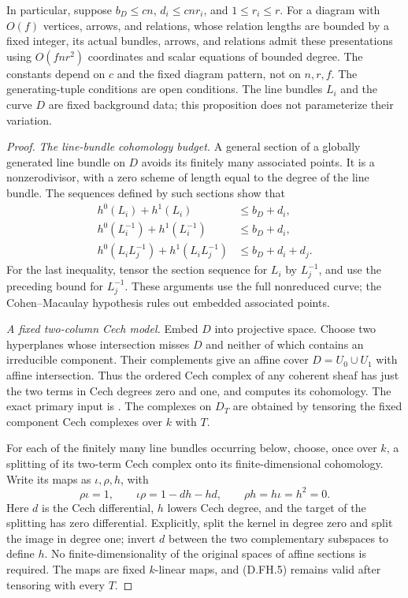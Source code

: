 \begin{proposition}
In particular, suppose $b_D\le cn$, $d_i\le cnr_i$, and
$1\le r_i\le r$. For a diagram with $O(f)$ vertices, arrows,
and relations, whose relation lengths are bounded by a fixed
integer, its actual bundles, arrows, and relations admit
these presentations using $O(fnr^2)$ coordinates and scalar
equations of bounded degree. The constants depend on $c$
and the fixed diagram pattern, not on $n,r,f$.
The generating-tuple conditions are open conditions.
The line bundles $L_i$ and the curve $D$ are fixed background
data; this proposition does not parameterize their variation.
\end{proposition}

\begin{proof}
\emph{The line-bundle cohomology budget.}
A general section of a globally generated line bundle on
$D$ avoids its finitely many associated points. It is a
nonzerodivisor, with a zero scheme of length equal to the
degree of the line bundle. The sequences defined by such
sections show that
\[
 \begin{split}
 h^0(L_i)+h^1(L_i)&\le b_D+d_i,\\
 h^0(L_i^{-1})+h^1(L_i^{-1})&\le b_D+d_i,\\
 h^0(L_iL_j^{-1})+h^1(L_iL_j^{-1})
                                      &\le b_D+d_i+d_j.
 \end{split}                                           \tag{D.FH.4}
\]
For the last inequality, tensor the section sequence for
$L_i$ by $L_j^{-1}$, and use the preceding bound for
$L_j^{-1}$. These arguments use the full nonreduced curve;
the Cohen--Macaulay hypothesis rules out embedded associated
points.

\emph{A fixed two-column Cech model.}
Embed $D$ into projective space. Choose two hyperplanes whose
intersection misses $D$ and neither of which contains an
irreducible component. Their complements give an affine
cover $D=U_0\cup U_1$ with affine intersection. Thus the
ordered Cech complex of any coherent sheaf has just the
two terms in Cech degrees zero and one, and computes its
cohomology. The exact primary input is
\citep[Lemmas~30.2.5--30.2.6 and the complete proofs;
Section~30.5, Lemmas~30.5.1--30.5.2]{C_StacksFiniteCechHom}.
The complexes on $D_T$ are obtained by tensoring the fixed
component Cech complexes over $k$ with $T$.

For each of the finitely many line bundles occurring below,
choose, once over $k$, a splitting of its two-term Cech
complex onto its finite-dimensional cohomology. Write its
maps as $\iota,\rho,h$, with
\[
 \rho\iota=1,\qquad
 \iota\rho=1-dh-hd,\qquad
 \rho h=h\iota=h^2=0.                                 \tag{D.FH.5}
\]
Here $d$ is the Cech differential, $h$ lowers Cech degree,
and the target of the splitting has zero differential.
Explicitly, split the kernel in degree zero and split the
image in degree one; invert $d$ between the two complementary
subspaces to define $h$. No finite-dimensionality of the
original spaces of affine sections is required. The maps
are fixed $k$-linear maps, and (D.FH.5) remains valid after
tensoring with every $T$.


\end{proof}
